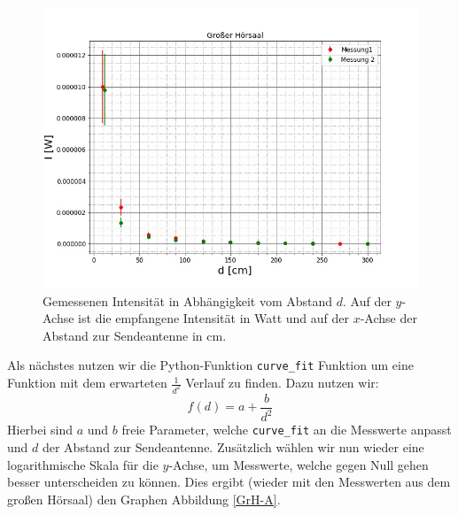 \documentclass[titlepage,11pt,a4paper,ngerman]{article}
\begin{document}
\begin{figure}[ht]
	\centering
	\includegraphics[scale=0.45]{Bilder/bsp}
	\caption{Gemessenen Intensität in Abhängigkeit vom Abstand $d$. Auf der $y$-Achse ist die empfangene Intensität in Watt und auf der $x$-Achse der Abstand zur Sendeantenne in cm.}
	\label{Abstand-bsp}
\end{figure}

\FloatBarrier

\noindent
Als nächstes nutzen wir die Python-Funktion \verb|curve_fit| \cite{curvescipy} Funktion um eine Funktion mit dem erwarteten $\frac{1}{d^{2}}$ Verlauf zu finden. Dazu nutzen wir:
\begin{equation}
f(d) = a + \frac{b}{d^{2}}
\label{f}
\end{equation}	
Hierbei sind $a$ und $b$ freie Parameter, welche \verb|curve_fit| an die Messwerte anpasst und $d$ der Abstand zur Sendeantenne. Zusätzlich wählen wir nun wieder eine logarithmische Skala für die $y$-Achse, um Messwerte, welche gegen Null gehen besser unterscheiden zu können. Dies ergibt (wieder mit den Messwerten aus dem großen Hörsaal) den Graphen Abbildung \ref{GrH-A}.
\end{document}
